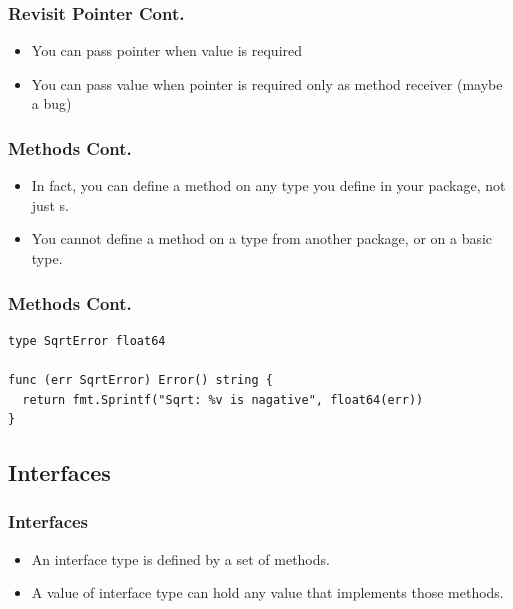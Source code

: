 \documentclass[xetex,mathserif,serif,12pt]{beamer}
\begin{document}
\begin{frame}
  \frametitle{Revisit Pointer Cont.}

  \begin{itemize}
  \item You can pass pointer when value is required
  \item You can pass value when pointer is required only as method receiver (maybe a bug)
  \end{itemize}
\end{frame}

\begin{frame}
  \frametitle{Methods Cont.}

  \begin{itemize}
  \item In fact, you can define a method on any type you define in your package, not just s.
  \item You cannot define a method on a type from another package, or on a basic type.
  \end{itemize}
\end{frame}

\begin{frame}[fragile]
  \frametitle{Methods Cont.}

  \begin{beamer@nomargin}
    \begin{lstlisting}
type SqrtError float64

func (err SqrtError) Error() string {
  return fmt.Sprintf("Sqrt: %v is nagative", float64(err))
}
    \end{lstlisting}
  \end{beamer@nomargin}
\end{frame}

\subsection{Interfaces}

\begin{frame}
  \frametitle{Interfaces}

  \begin{itemize}
  \item An interface type is defined by a set of methods.
  \item A value of interface type can hold any value that implements those methods.
  \end{itemize}
\end{frame}
\end{document}
